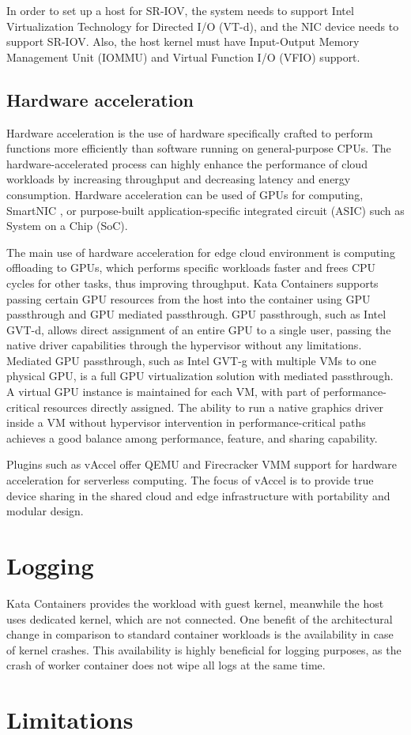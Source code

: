 In order to set up a host for SR-IOV, the system needs to support Intel Virtualization Technology for Directed I/O (VT-d), and the NIC device needs to support SR-IOV. Also, the host kernel must have Input-Output Memory Management Unit (IOMMU) and Virtual Function I/O (VFIO) support.

\subsection{Hardware acceleration}

Hardware acceleration is the use of hardware specifically crafted to perform functions more efficiently than software running on general-purpose CPUs. The hardware-accelerated process can highly enhance the performance of cloud workloads by increasing throughput and decreasing latency and energy consumption. Hardware acceleration can be used of GPUs for computing, SmartNIC \cite{SmartNICIntel}, or purpose-built application-specific integrated circuit (ASIC) such as System on a Chip (SoC).

The main use of hardware acceleration for edge cloud environment is computing offloading to GPUs, which performs specific workloads faster and frees CPU cycles for other tasks, thus improving throughput. Kata Containers supports passing certain GPU resources from the host into the container using GPU passthrough and GPU mediated passthrough. GPU passthrough, such as Intel GVT-d, allows direct assignment of an entire GPU to a single user, passing the native driver capabilities through the hypervisor without any limitations. Mediated GPU passthrough, such as Intel GVT-g with multiple VMs to one physical GPU, is a full GPU virtualization solution with mediated passthrough. A virtual GPU instance is maintained for each VM, with part of performance-critical resources directly assigned. The ability to run a native graphics driver inside a VM without hypervisor intervention in performance-critical paths achieves a good balance among performance, feature, and sharing capability. \cite{GPUKataContainers}

Plugins such as vAccel \cite{vAccel} offer QEMU and Firecracker VMM support for hardware acceleration for serverless computing. The focus of vAccel is to provide true device sharing in the shared cloud and edge infrastructure with portability and modular design.
		
\section{Logging}

Kata Containers provides the workload with guest kernel, meanwhile the host uses dedicated kernel, which are not connected. One benefit of the architectural change in comparison to standard container workloads is the availability in case of kernel crashes. This availability is highly beneficial for logging purposes, as the crash of worker container does not wipe all logs at the same time.

\section{Limitations}
